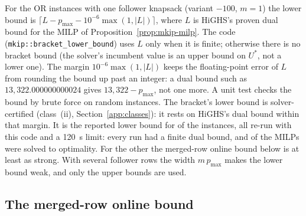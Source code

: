For the OR instances with one follower knapsack (variant $-100$, $m=1$) the
lower bound is $\lceil L-p_{\max}-10^{-6}\max(1,|L|)\rceil$, where $L$ is HiGHS's
proven dual bound for the MILP of Proposition~\ref{prop:mkip-milp}. The code
(\texttt{mkip::bracket\_lower\_bound}) uses $L$ only when it is finite; otherwise
there is no bracket bound (the solver's incumbent value is an upper bound on
$U^{*}$, not a lower one). The margin $10^{-6}\max(1,|L|)$ keeps the
floating-point error of $L$ from rounding the bound up past an integer: a dual
bound such as $13{,}322.000000000024$ gives $13{,}322-p_{\max}$, not one more.
A unit test checks the bound by brute force on random instances. The bracket's
lower bound is solver-certified (class~(ii), Section~\ref{app:classes}): it rests
on HiGHS's dual bound within that margin. It is the reported lower bound for
\SuppOrLbMilp{} of the \NumOrOneKnapsack{} instances, all re-run with this code and
a 120~s limit: every run had a finite dual bound, and \SuppOrBracketOptimal{} of
the MILPs were solved to optimality. For the other \SuppOrLbOmega{} the merged-row
online bound below is at least as strong. With several follower rows the width
$m\,p_{\max}$ makes the lower bound weak, and only the upper bounds are used.

\subsection{The merged-row online bound}


